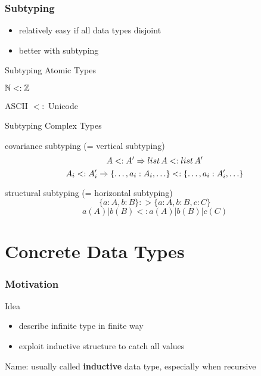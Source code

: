 \begin{frame}\frametitle{Subtyping}
\begin{itemize}
 \item relatively easy if all data types disjoint
 \item better with subtyping
\end{itemize}

\begin{blockitems}{Subtyping Atomic Types}
 \item $\mathbb{N} <: \mathbb{Z}$
 \item ASCII $<:$ Unicode
\end{blockitems}

\begin{blockitems}{Subtyping Complex Types}
 \item covariance subtyping (= vertical subtyping)
  \[A <: A' \Rightarrow list\,A <: list\, A'\]
  \[A_i <: A_i' \Rightarrow \{\ldots, a_i:A_i,\ldots\} <: \{\ldots, a_i:A'_i,\ldots\}\]
 \item structural subtyping (= horizontal subtyping)
  \[\{a:A,b:B\} :> \{a:A,b:B,c:C\}\]
  \[a(A)|b(B) <: a(A)|b(B)|c(C)\]
\end{blockitems}
\end{frame}

\section{Concrete Data Types}

\begin{frame}[fragile]\frametitle{Motivation}
Idea
\begin{itemize}
\item describe infinite type in finite way
\item exploit inductive structure to catch all values
\end{itemize}

Name: usually called \textbf{inductive} data type, especially when recursive
\end{frame}

